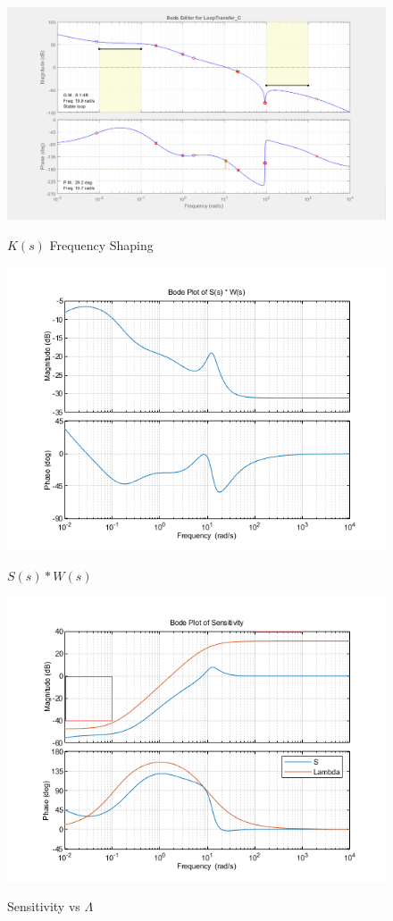 \documentclass[]{article}
\begin{document}
\begin{figure}[h]
	\caption{$K(s)$ Frequency Shaping}
	\centering
	\includegraphics[width=\textwidth]{designing}
	\label{fig:design}
\end{figure}

\begin{figure}[h]
	\caption{$S(s) * W(s)$}
	\centering
	\includegraphics[width=\textwidth]{SensitivityTimesW}
	\label{fig:sw}
\end{figure}

\begin{figure}[h]
	\caption{Sensitivity vs $\Lambda$}
	\centering
	\includegraphics[width=\textwidth]{Sensitivity}
	\label{fig:sens}
\end{figure}
\end{document}
